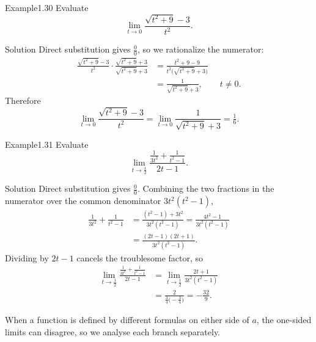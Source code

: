 \documentclass[a4paper,12pt,oneside]{memoir}
\begin{document}
\begin{workedexample}
\begin{envexample}{Example}{1.30}{}
Evaluate \[ \lim_{t \to 0} \frac{\sqrt{t^{2} + 9} - 3}{t^{2}}. \]
\end{envexample}
\begin{envsolution}{Solution}{}{}
Direct substitution gives \(\tfrac{0}{0}\), so we rationalize the numerator: \[ \begin{aligned} \frac{\sqrt{t^{2} + 9} - 3}{t^{2}} \cdot \frac{\sqrt{t^{2} + 9} + 3}{\sqrt{t^{2} + 9} + 3} &= \frac{t^{2} + 9 - 9}{t^{2}\bigl(\sqrt{t^{2} + 9} + 3\bigr)}\\ &= \frac{1}{\sqrt{t^{2} + 9} + 3}, \qquad t \neq 0. \end{aligned} \] Therefore \[ \lim_{t \to 0} \frac{\sqrt{t^{2} + 9} - 3}{t^{2}} = \lim_{t \to 0} \frac{1}{\sqrt{t^{2} + 9} + 3} = \tfrac{1}{6}. \]
\end{envsolution}
\end{workedexample}
\begin{workedexample}
\begin{envexample}{Example}{1.31}{}
Evaluate \[ \lim_{t \to \frac{1}{2}} \frac{\frac{1}{3t^{2}} + \frac{1}{t^{2} - 1}}{2t - 1}. \]
\end{envexample}
\begin{envsolution}{Solution}{}{}
Direct substitution gives \(\tfrac{0}{0}\). Combining the two fractions in the numerator over the common denominator \(3t^{2}(t^{2} - 1)\), \[ \begin{aligned} \frac{1}{3t^{2}} + \frac{1}{t^{2} - 1} &= \frac{(t^{2} - 1) + 3t^{2}}{3t^{2}(t^{2} - 1)} = \frac{4t^{2} - 1}{3t^{2}(t^{2} - 1)} \\ &= \frac{(2t - 1)(2t + 1)}{3t^{2}(t^{2} - 1)}. \end{aligned} \] Dividing by \(2t - 1\) cancels the troublesome factor, so \[ \begin{aligned} \lim_{t \to \frac{1}{2}} \frac{\frac{1}{3t^{2}} + \frac{1}{t^{2} - 1}}{2t - 1} &= \lim_{t \to \frac{1}{2}} \frac{2t + 1}{3t^{2}(t^{2} - 1)} \\ &= \frac{2}{\tfrac{3}{4}\bigl(-\tfrac{3}{4}\bigr)} = -\frac{32}{9}. \end{aligned} \]
\end{envsolution}
\end{workedexample}
When a function is defined by different formulas on either side of \(a\), the one-sided limits can disagree, so we analyse each branch separately.
\end{document}
